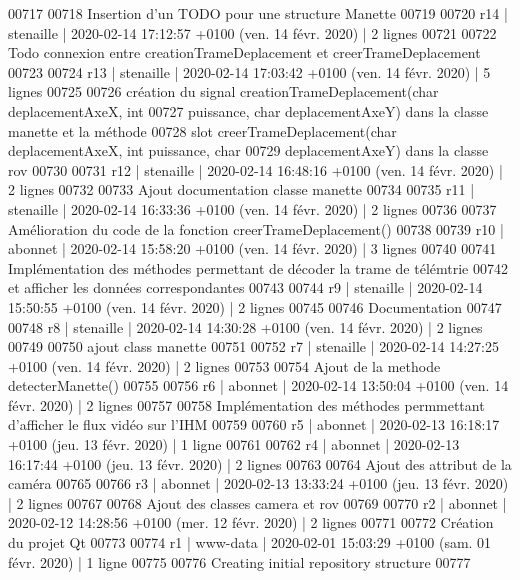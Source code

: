 \begin{DoxyCode}
00717 
00718 Insertion d'un TODO pour une structure Manette
00719 
00720 r14 | stenaille | 2020-02-14 17:12:57 +0100 (ven. 14 févr. 2020) | 2 lignes
00721 
00722 Todo connexion entre creationTrameDeplacement et creerTrameDeplacement
00723 
00724 r13 | stenaille | 2020-02-14 17:03:42 +0100 (ven. 14 févr. 2020) | 5 lignes
00725 
00726 création du signal creationTrameDeplacement(char deplacementAxeX, int
00727 puissance, char deplacementAxeY) dans la classe manette et la méthode
00728 slot creerTrameDeplacement(char deplacementAxeX, int puissance, char
00729 deplacementAxeY) dans la classe rov
00730 
00731 r12 | stenaille | 2020-02-14 16:48:16 +0100 (ven. 14 févr. 2020) | 2 lignes
00732 
00733 Ajout documentation classe manette
00734 
00735 r11 | stenaille | 2020-02-14 16:33:36 +0100 (ven. 14 févr. 2020) | 2 lignes
00736 
00737 Amélioration du code de la fonction creerTrameDeplacement()
00738 
00739 r10 | abonnet | 2020-02-14 15:58:20 +0100 (ven. 14 févr. 2020) | 3 lignes
00740 
00741 Implémentation des méthodes permettant de décoder la trame de télémtrie
00742 et afficher les données correspondantes
00743 
00744 r9 | stenaille | 2020-02-14 15:50:55 +0100 (ven. 14 févr. 2020) | 2 lignes
00745 
00746 Documentation
00747 
00748 r8 | stenaille | 2020-02-14 14:30:28 +0100 (ven. 14 févr. 2020) | 2 lignes
00749 
00750 ajout class manette
00751 
00752 r7 | stenaille | 2020-02-14 14:27:25 +0100 (ven. 14 févr. 2020) | 2 lignes
00753 
00754 Ajout de la methode detecterManette()
00755 
00756 r6 | abonnet | 2020-02-14 13:50:04 +0100 (ven. 14 févr. 2020) | 2 lignes
00757 
00758 Implémentation des méthodes permmettant d'afficher le flux vidéo sur l'IHM
00759 
00760 r5 | abonnet | 2020-02-13 16:18:17 +0100 (jeu. 13 févr. 2020) | 1 ligne
00761 
00762 r4 | abonnet | 2020-02-13 16:17:44 +0100 (jeu. 13 févr. 2020) | 2 lignes
00763 
00764 Ajout des attribut de la caméra
00765 
00766 r3 | abonnet | 2020-02-13 13:33:24 +0100 (jeu. 13 févr. 2020) | 2 lignes
00767 
00768 Ajout des classes camera et rov
00769 
00770 r2 | abonnet | 2020-02-12 14:28:56 +0100 (mer. 12 févr. 2020) | 2 lignes
00771 
00772 Création du projet Qt
00773 
00774 r1 | www-data | 2020-02-01 15:03:29 +0100 (sam. 01 févr. 2020) | 1 ligne
00775 
00776 Creating initial repository structure
00777 
\end{DoxyCode}
